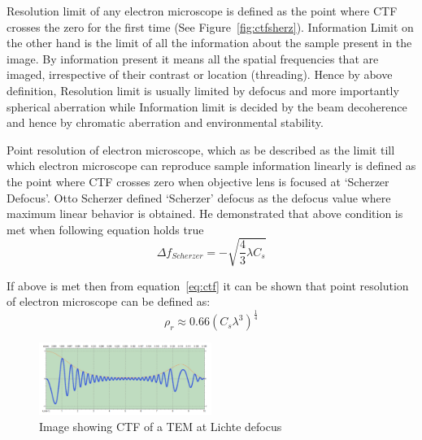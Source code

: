 Resolution limit of any electron microscope is defined as the point where CTF crosses the zero for the first time (See Figure~\ref{fig:ctfsherz}).
Information Limit on the other hand is the limit of all the information about the sample present in the image.
By information present it means all the spatial frequencies that are imaged, irrespective of their contrast or location (threading).
Hence by above definition, Resolution limit is usually limited by defocus and more importantly spherical aberration while Information limit is decided by the beam decoherence and hence by chromatic aberration and environmental stability.

Point resolution of electron microscope, which as be described as the limit till which electron microscope can reproduce sample information linearly is defined as the point where CTF crosses zero when objective lens is focused at `Scherzer Defocus'.
Otto Scherzer defined `Scherzer' defocus as the defocus value where maximum linear behavior is obtained.
He demonstrated that above condition is met when following equation holds true\cite{Scherzer1949}
\begin{equation}
    \Delta f_{Scherzer} = -\sqrt{\frac{4}{3}\lambda C_s}
    \label{eq:scherzerdefocus}
\end{equation}

If above is met then from equation~\ref{eq:ctf} it can be shown that point resolution of electron microscope can be defined as:
\begin{equation}
    \rho_r \approx 0.66 (C_s \lambda^3)^{\frac{1}{4}} 
    \label{eq:pointresol}
\end{equation}

\begin{figure}[b]
    \centering
        \includegraphics[width=0.5\textwidth]{figures/lichte.pdf}
        \caption{Image showing CTF of a TEM at Lichte defocus}
        \label{fig:ctflichte}
\end{figure}


